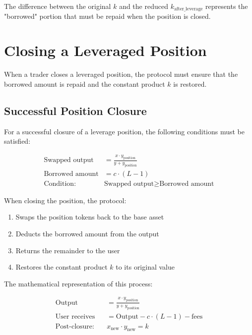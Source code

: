 \documentclass[11pt]{article}
\begin{document}
The difference between the original $k$ and the reduced $k_{\text{after\_leverage}}$ represents the "borrowed" portion that must be repaid when the position is closed.

\section{Closing a Leveraged Position}

When a trader closes a leveraged position, the protocol must ensure that the borrowed amount is repaid and the constant product $k$ is restored.

\subsection{Successful Position Closure}

For a successful closure of a leverage position, the following conditions must be satisfied:

\begin{equation}
\begin{aligned}
\text{Swapped output} &= \frac{x \cdot y_{\text{position}}}{y + y_{\text{position}}} \\
\text{Borrowed amount} &= c \cdot (L - 1) \\
\text{Condition:} \quad &\text{Swapped output} \geq \text{Borrowed amount}
\end{aligned}
\end{equation}

When closing the position, the protocol:
\begin{enumerate}
    \item Swaps the position tokens back to the base asset
    \item Deducts the borrowed amount from the output
    \item Returns the remainder to the user
    \item Restores the constant product $k$ to its original value
\end{enumerate}

The mathematical representation of this process:

\begin{equation}
\begin{aligned}
\text{Output} &= \frac{x \cdot y_{\text{position}}}{y + y_{\text{position}}} \\
\text{User receives} &= \text{Output} - c \cdot (L - 1) - \text{fees} \\
\text{Post-closure:} \quad &x_{\text{new}} \cdot y_{\text{new}} = k
\end{aligned}
\end{equation}
\end{document}
